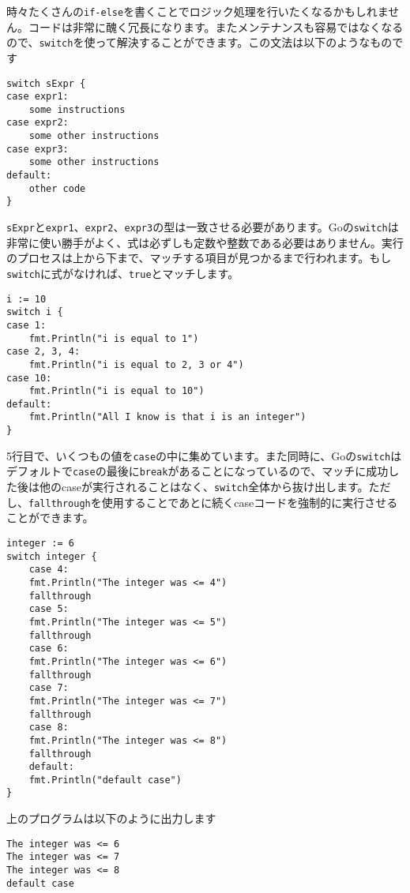 時々たくさんの\texttt{if-else}を書くことでロジック処理を行いたくなるかもしれません。コードは非常に醜く冗長になります。またメンテナンスも容易ではなくなるので、\texttt{switch}を使って解決することができます。この文法は以下のようなものです

\begin{lstlisting}[numbers=none]
switch sExpr {
case expr1:
    some instructions
case expr2:
    some other instructions
case expr3:
    some other instructions
default:
    other code
}
\end{lstlisting}

\texttt{sExpr}と\texttt{expr1}、\texttt{expr2}、\texttt{expr3}の型は一致させる必要があります。Goの\texttt{switch}は非常に使い勝手がよく、式は必ずしも定数や整数である必要はありません。実行のプロセスは上から下まで、マッチする項目が見つかるまで行われます。もし\texttt{switch}に式がなければ、\texttt{true}とマッチします。

\begin{lstlisting}[]
i := 10
switch i {
case 1:
    fmt.Println("i is equal to 1")
case 2, 3, 4:
    fmt.Println("i is equal to 2, 3 or 4")
case 10:
    fmt.Println("i is equal to 10")
default:
    fmt.Println("All I know is that i is an integer")
}
\end{lstlisting}

5行目で、いくつもの値を\texttt{case}の中に集めています。また同時に、Goの\texttt{switch}はデフォルトで\texttt{case}の最後に\texttt{break}があることになっているので、マッチに成功した後は他のcaseが実行されることはなく、\texttt{switch}全体から抜け出します。ただし、\texttt{fallthrough}を使用することであとに続くcaseコードを強制的に実行させることができます。

\begin{lstlisting}[numbers=none]
integer := 6
switch integer {
    case 4:
    fmt.Println("The integer was <= 4")
    fallthrough
    case 5:
    fmt.Println("The integer was <= 5")
    fallthrough
    case 6:
    fmt.Println("The integer was <= 6")
    fallthrough
    case 7:
    fmt.Println("The integer was <= 7")
    fallthrough
    case 8:
    fmt.Println("The integer was <= 8")
    fallthrough
    default:
    fmt.Println("default case")
}
\end{lstlisting}

上のプログラムは以下のように出力します

\begin{lstlisting}[numbers=none]
The integer was <= 6
The integer was <= 7
The integer was <= 8
default case
\end{lstlisting}

